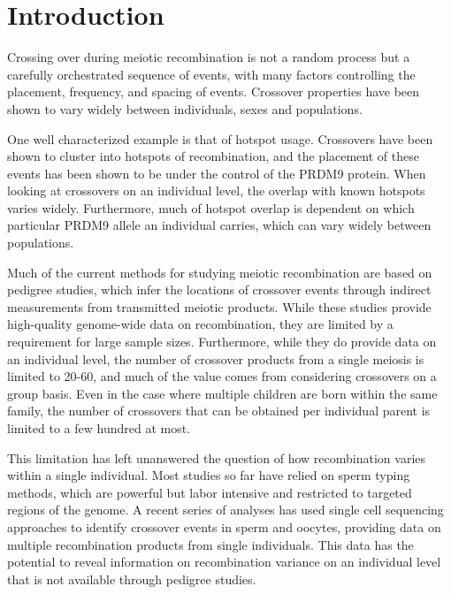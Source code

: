 

\section{Introduction}

Crossing over during meiotic recombination is not a random process but a carefully orchestrated sequence of events, with many factors controlling the placement, frequency, and spacing of events.
Crossover properties have been shown to vary widely between individuals, sexes and populations.

One well characterized example is that of hotspot usage.
Crossovers have been shown to cluster into hotspots of recombination\cite{Myers2005,hapmap2007}, and the placement of these events has been shown to be under the control of the PRDM9 protein\cite{Baudat2010,Myers2010,Parvanov2010}.
When looking at crossovers on an individual level, the overlap with known hotspots varies widely\cite{Coop2008}.
Furthermore, much of hotspot overlap is dependent on which particular PRDM9 allele an individual carries, which can vary widely between populations\cite{Baudat2010,Hinch2011}.

Much of the current methods for studying meiotic recombination are based on pedigree studies, which infer the locations of crossover events through indirect measurements from transmitted meiotic products.
While these studies provide high-quality genome-wide data on recombination, they are limited by a requirement for large sample sizes.
Furthermore, while they do provide data on an individual level, the number of crossover products from a single meiosis is limited to 20-60\cite{Lynn2004,Coop2008}, and much of the value comes from considering crossovers on a group basis.
Even in the case where multiple children are born within the same family, the number of crossovers that can be obtained per individual parent is limited to a few hundred at most.

This limitation has left unanswered the question of how recombination varies within a single individual.
Most studies so far have relied on sperm typing methods, which are powerful but labor intensive and restricted to targeted regions of the genome\cite{Jeffreys2004}.
A recent series of analyses has used single cell sequencing approaches to identify crossover events in sperm\cite{Wang2012,Lu2012} and oocytes\cite{Hou2013}, providing data on multiple recombination products from single individuals.
This data has the potential to reveal information on recombination variance on an individual level that is not available through pedigree studies.

